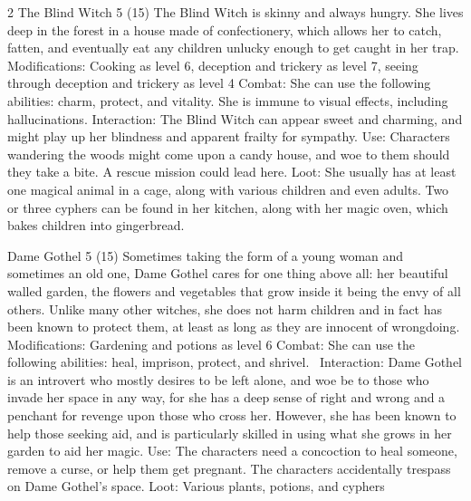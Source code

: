 \begin{multicols}{2}
The Blind Witch 5 (15)
The Blind Witch is skinny and always hungry. She lives deep in the forest in a house made of confectionery, which allows her to catch, fatten, and eventually eat any children unlucky enough to get caught in her trap.
Modifications: Cooking as level 6, deception and trickery as level 7, seeing through
deception and trickery as level 4
Combat: She can use the following abilities: charm, protect, and vitality. She is immune to visual effects, including hallucinations.
Interaction: The Blind Witch can appear sweet and charming, and might play up her blindness and apparent frailty for sympathy.
Use: Characters wandering the woods might come upon a candy house, and woe to them
should they take a bite. A rescue mission could lead here.
Loot: She usually has at least one magical animal in a cage, along with various children and
even adults. Two or three cyphers can be found in her kitchen, along with her magic oven, which bakes children into gingerbread.

Dame Gothel 5 (15)
Sometimes taking the form of a young woman and sometimes an old one, Dame Gothel cares for one thing above all: her beautiful walled garden, the flowers and vegetables that grow inside it being the envy of all others. Unlike many other witches, she does not harm children and in fact has been known to protect them, at least as long as they are innocent of wrongdoing.
Modifications: Gardening and potions as level 6
Combat: She can use the following abilities: heal, imprison, protect, and shrivel. 
Interaction: Dame Gothel is an introvert who mostly desires to be left alone, and woe be
to those who invade her space in any way, for she has a deep sense of right and wrong and a penchant for revenge upon those who cross her. However, she has been known to help those seeking aid, and is particularly skilled in using what she grows in her garden to aid her magic.
Use: The characters need a concoction to heal someone, remove a curse, or help them get pregnant. The characters accidentally trespass on Dame Gothel’s space.
Loot: Various plants, potions, and cyphers


\end{multicols}
